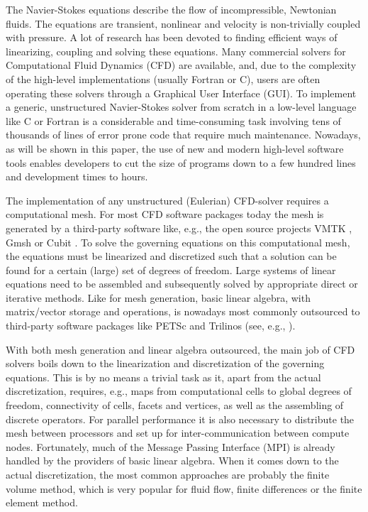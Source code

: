 \documentclass[final,3p,times,twocolumn]{elsarticle}
\begin{document}
The Navier-Stokes equations describe the flow of incompressible, Newtonian fluids. The equations are transient, nonlinear and velocity is non-trivially coupled with pressure. A lot of research has been devoted to finding efficient ways of linearizing, coupling and solving these equations. Many commercial solvers for Computational Fluid Dynamics (CFD) are available, and, due to the complexity of the high-level implementations (usually Fortran or C), users are often operating these solvers through a Graphical User Interface (GUI). To implement a generic, unstructured Navier-Stokes solver from scratch in a low-level language like C or Fortran is a considerable and time-consuming task involving tens of thousands of lines of error prone code that require much maintenance. Nowadays, as will be shown in this paper, the use of new and modern high-level software tools enables developers to cut the size of programs down to a few hundred lines and development times to hours. 

The implementation of any unstructured (Eulerian) CFD-solver requires a computational mesh. For most CFD software packages today the mesh is generated by a third-party software like, e.g., the open source projects VMTK \cite{vmtk}, Gmsh \cite{gmsh} or Cubit \cite{cubit}. To solve the governing equations on this computational mesh, the equations must be linearized and discretized such that a solution can be found for a certain (large) set of degrees of freedom. Large systems of linear equations need to be assembled and subsequently solved by appropriate direct or iterative methods. Like for mesh generation, basic linear algebra, with matrix/vector storage and operations, is nowadays most commonly outsourced to third-party software packages like PETSc \cite{petsc-web-page} and Trilinos \cite{trilinos} (see, e.g., \cite{openfvm, fluidity, oofem}). 

With both mesh generation and linear algebra outsourced, the main job of CFD solvers boils down to the linearization and discretization of the governing equations. This is by no means a trivial task as it, apart from the actual discretization, requires, e.g., maps from computational cells to global degrees of freedom, connectivity of cells, facets and vertices, as well as the assembling of discrete operators. For parallel performance it is also necessary to distribute the mesh between processors and set up for inter-communication between compute nodes. Fortunately, much of the Message Passing Interface (MPI) is already handled by the providers of basic linear algebra. When it comes down to the actual discretization, the most common approaches are probably the finite volume method, which is very popular for fluid flow, finite differences or the finite element method.
\end{document}
